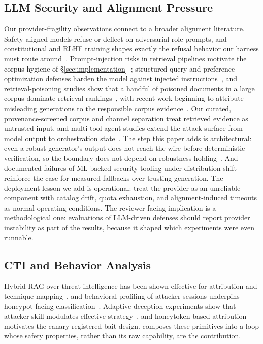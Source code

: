 \subsection{LLM Security and Alignment Pressure}
Our provider-fragility observations connect to a broader alignment literature.
Safety-aligned models refuse or deflect on adversarial-role prompts, and
constitutional and RLHF training shapes exactly the refusal behavior our
harness must route around~\cite{bai2022,ganguli2022,christiano2017}.
Prompt-injection risks in retrieval pipelines motivate the corpus hygiene
of \S\ref{sec:implementation}~\cite{greshake2023,perez2022}; structured-query
and preference-optimization defenses harden the model against
injected instructions~\cite{chen2025struq,chen2025secalign}, and
retrieval-poisoning studies show that a handful of poisoned documents
in a large corpus dominate retrieval
rankings~\cite{zou2025poisonedrag,malladi2026ripeii}, with
recent work beginning to attribute misleading generations to the
responsible corpus evidence~\cite{zhang2026ragorigin}. Our curated,
provenance-screened corpus and
channel separation treat retrieved evidence as untrusted input, and
multi-tool agent studies extend the attack surface from model output to
orchestration state~\cite{li2026dissonances}. The step this paper adds
is architectural: even a robust generator's output does not reach the
wire before deterministic verification, so the boundary does not depend
on robustness holding~\cite{chen2025struq,chen2025secalign}. And
documented failures of ML-backed security tooling under distribution
shift~\cite{reworr2024} reinforce the case for measured fallbacks over
trusting generation. The deployment lesson we add is operational:
treat the provider as an unreliable component with catalog drift, quota
exhaustion, and alignment-induced timeouts as normal operating conditions.
The reviewer-facing implication is a methodological one: evaluations of
LLM-driven defenses should report provider instability as part of the
results, because it shaped which experiments were even runnable.

\subsection{CTI and Behavior Analysis}
Hybrid RAG over threat intelligence has been shown effective for
attribution and technique mapping~\cite{alsada2024,rajapaksha2024},
and behavioral profiling of attacker sessions underpins
honeypot-facing classification~\cite{lekssays2025}. Adaptive
deception experiments show that attacker skill modulates effective
strategy~\cite{kouremetis2024}, and honeytoken-based
attribution motivates the canary-registered bait
design. \system composes these primitives into a loop whose safety
properties, rather than its raw capability, are the contribution.
